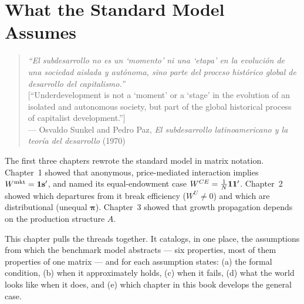 \documentclass[../structural_economics_book.tex]{subfiles}
\begin{document}
\ifSubfilesClassLoaded{\setcounter{chapter}{3}}{}
\chapter{What the Standard Model Assumes}\label{ch:04}
\begin{quote}
\textit{``El subdesarrollo no es un `momento' ni una `etapa' en la evoluci\'{o}n de una sociedad aislada y aut\'{o}noma, sino parte del proceso hist\'{o}rico global de desarrollo del capitalismo.''}\\[0.3em]
\textnormal{[``Underdevelopment is not a `moment' or a `stage' in the evolution of an isolated and autonomous society, but part of the global historical process of capitalist development.'']}\\
\hfill --- Osvaldo Sunkel and Pedro Paz, \textit{El subdesarrollo latinoamericano y la teor\'{i}a del desarrollo} (1970)
\end{quote}
\nocite{sunkel1970subdesarrollo}

\vspace{1em}

The first three chapters rewrote the standard model in matrix notation. Chapter~1 showed that anonymous, price-mediated interaction implies $W^{\text{mkt}} = \mathbf{1}\mathbf{s}'$, and named its equal-endowment case $W^{CE} = \frac{1}{N}\mathbf{1}\mathbf{1}'$. Chapter~2 showed which departures from it break efficiency ($W^U \neq 0$) and which are distributional (unequal $\boldsymbol{\pi}$). Chapter~3 showed that growth propagation depends on the production structure $A$.

This chapter pulls the threads together. It catalogs, in one place, the assumptions from which the benchmark model abstracts --- six properties, most of them properties of one matrix --- and for each assumption states: (a) the formal condition, (b) when it approximately holds, (c) when it fails, (d) what the world looks like when it does, and (e) which chapter in this book develops the general case.
\end{document}
